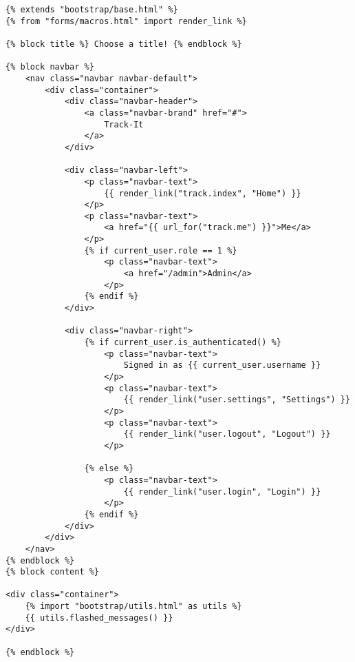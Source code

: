 \documentclass[../main/main.tex]{subfiles}
\begin{document}
\begin{lstlisting}
{% extends "bootstrap/base.html" %}
{% from "forms/macros.html" import render_link %}

{% block title %} Choose a title! {% endblock %}

{% block navbar %}
    <nav class="navbar navbar-default">
        <div class="container">
            <div class="navbar-header">
                <a class="navbar-brand" href="#">
                    Track-It
                </a>
            </div>

            <div class="navbar-left">
                <p class="navbar-text">
                    {{ render_link("track.index", "Home") }}
                </p>
                <p class="navbar-text">
                    <a href="{{ url_for("track.me") }}">Me</a>
                </p>
                {% if current_user.role == 1 %}
                    <p class="navbar-text">
                        <a href="/admin">Admin</a>
                    </p>
                {% endif %}
            </div>

            <div class="navbar-right">
                {% if current_user.is_authenticated() %}
                    <p class="navbar-text">
                        Signed in as {{ current_user.username }}
                    </p>
                    <p class="navbar-text">
                        {{ render_link("user.settings", "Settings") }}
                    </p>
                    <p class="navbar-text">
                        {{ render_link("user.logout", "Logout") }}
                    </p>

                {% else %}
                    <p class="navbar-text">
                        {{ render_link("user.login", "Login") }}
                    </p>
                {% endif %}
            </div>
        </div>
    </nav>
{% endblock %}
{% block content %}

<div class="container">
    {% import "bootstrap/utils.html" as utils %}
    {{ utils.flashed_messages() }}
</div>

{% endblock %}
\end{lstlisting}


% 
\end{document}
